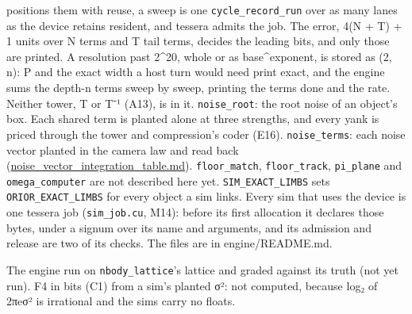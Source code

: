 \begin{description}
positions them with reuse, a sweep is one \texttt{cycle\_\allowbreak{}record\_\allowbreak{}run} over as many lanes as the device retains resident, and tessera admits the job. The error, 4(N + T) + 1 units over N terms and T tail terms, decides the leading bits, and only those are printed. A resolution past 2\textasciicircum{}20, whole or as base\textasciicircum{}exponent, is stored as (2, n): P and the exact width a host turn would need print exact, and the engine sums the depth-n terms sweep by sweep, printing the terms done and the rate. Neither tower, T or T⁻¹ (A13), is in it. \texttt{noise\_\allowbreak{}root}: the root noise of an object's box. Each shared term is planted alone at three strengths, and every yank is priced through the tower and compression's coder (E16). \texttt{noise\_\allowbreak{}terms}: each noise vector planted in the camera law and read back (\hyperref[chap:noise-vector-integration-table]{noise\_\allowbreak{}vector\_\allowbreak{}integration\_\allowbreak{}table.md}). \texttt{floor\_\allowbreak{}match}, \texttt{floor\_\allowbreak{}track}, \texttt{pi\_\allowbreak{}plane} and \texttt{omega\_\allowbreak{}computer} are not described here yet. \texttt{SIM\_\allowbreak{}EXACT\_\allowbreak{}LIMBS} sets \texttt{ORIOR\_\allowbreak{}EXACT\_\allowbreak{}LIMBS} for every object a sim links. Every sim that uses the device is one tessera job (\texttt{sim\_\allowbreak{}job.\allowbreak{}cu}, M14): before its first allocation it declares those bytes, under a signum over its name and arguments, and its admission and release are two of its checks. The files are in engine/README.md.
\item[{wants}] The engine run on \texttt{nbody\_\allowbreak{}lattice}'s lattice and graded against its truth (not yet run). F4 in bits (C1) from a sim's planted σ²: not computed, because log₂ of 2πeσ² is irrational and the sims carry no floats.

\end{description}
